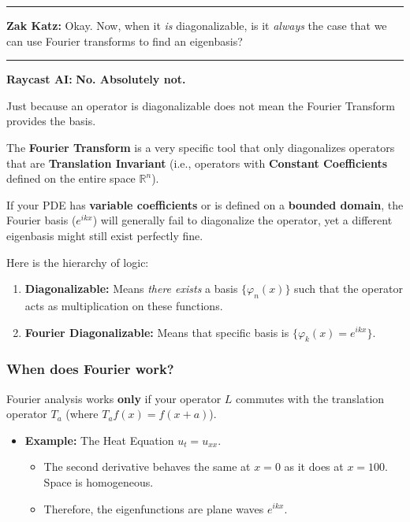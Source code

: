 \documentclass[oneside]{book}
\renewcommand{\phi}{\varphi}
\begin{document}
\noindent\rule{\textwidth}{0.4pt}

\noindent \textbf{Zak Katz:} Okay. Now, when it \textit{is} diagonalizable, is it \textit{always} the case that we can use Fourier transforms to find an eigenbasis?

\noindent\rule{\textwidth}{0.4pt}

\noindent \textbf{Raycast AI:} \textbf{No. Absolutely not.}

Just because an operator is diagonalizable does not mean the Fourier Transform provides the basis.

The \textbf{Fourier Transform} is a very specific tool that only diagonalizes operators that are \textbf{Translation Invariant} (i.e., operators with \textbf{Constant Coefficients} defined on the entire space $\mathbb{R}^n$).

If your PDE has \textbf{variable coefficients} or is defined on a \textbf{bounded domain}, the Fourier basis ($e^{ikx}$) will generally fail to diagonalize the operator, yet a different eigenbasis might still exist perfectly fine.

Here is the hierarchy of logic:

\begin{enumerate}
    \item \textbf{Diagonalizable:} Means \textit{there exists} a basis $\{\phi_n(x)\}$ such that the operator acts as multiplication on these functions.
    \item \textbf{Fourier Diagonalizable:} Means that specific basis is $\{\phi_k(x) = e^{ikx}\}$.
\end{enumerate}

\subsubsection*{When does Fourier work?}
Fourier analysis works \textbf{only} if your operator $L$ commutes with the translation operator $T_a$ (where $T_a f(x) = f(x+a)$).
\begin{itemize}
    \item \textbf{Example:} The Heat Equation $u_t = u_{xx}$.
    \begin{itemize}
        \item The second derivative behaves the same at $x=0$ as it does at $x=100$. Space is homogeneous.
        \item Therefore, the eigenfunctions are plane waves $e^{ikx}$.
    \end{itemize}
\end{itemize}
\end{document}
